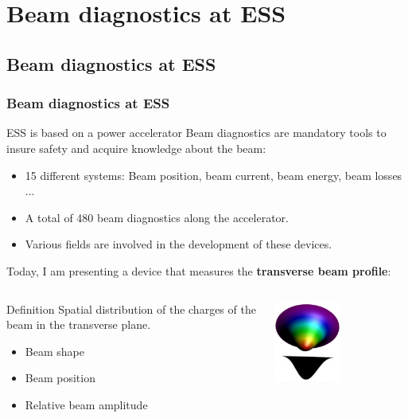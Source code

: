 \section{Beam diagnostics at ESS}
\subsection{Beam diagnostics at ESS}
\begin{frame}[t]
  \frametitle{Beam diagnostics at ESS}
  \begin{block}{ESS is based on a power accelerator}
    Beam diagnostics are mandatory tools to insure safety and acquire knowledge about the beam:
    \begin{itemize}
      \item 15 different systems: Beam position, beam current, beam energy, beam losses ...
      \item A total of 480 beam diagnostics along the accelerator.
      \item Various fields are involved in the development of these devices.
    \end{itemize}
  \end{block}

  Today, I am presenting a device that measures the \textbf{transverse beam profile}:
  \begin{columns}[T]
    \begin{column}{0.60\textwidth}
      \begin{block}{Definition}
        Spatial distribution of the charges of the beam in the transverse plane.
        \begin{itemize}
          \item Beam shape
          \item Beam position
          \item Relative beam amplitude
        \end{itemize}
      \end{block}
    \end{column}
    \begin{column}{0.30\textwidth}
      \centering
      \includegraphics[width=0.5\textwidth]{02_ESS/fig/fig000_profile2}
    \end{column}
  \end{columns}
\end{frame}

